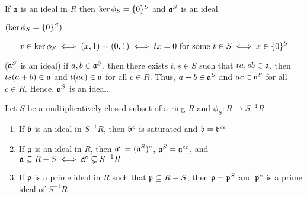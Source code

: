 \begin{proposition}
	If $\mathfrak{a}$ is an ideal in $R$ then $\ker \phi_S = \{0\}^S$ and $\mathfrak{a}^S$ is an ideal
\end{proposition}

\begin{longproof}
	$(\ker \phi_S = \{0\}^S)$

	$$
		x \in \ker \phi_S \iff (x, 1) \sim (0, 1) \iff tx = 0 \text{ for some } t \in S \iff x \in \{0\}^S
	$$
	
	($\mathfrak{a}^S$ is an ideal) if $a, b \in \mathfrak{a}^S$, then there exists $t, s \in S$ such that $ta, sb \in \mathfrak{a}$, then $ts(a + b) \in \mathfrak{a}$ and $t (ac) \in \mathfrak{a}$ for all $c \in R$. Thus, $a + b \in \mathfrak{a}^S$ and $ac \in \mathfrak{a}^S$ for all $c \in R$. Hence, $\mathfrak{a}^S$ is an ideal.
\end{longproof}


\begin{lemma}
	Let $S$ be a multiplicatively closed subset of a ring $R$ and $\phi_S: R \to S^{-1} R$
	\begin{enumerate}
		\item If $\mathfrak{b}$ is an ideal in $S^{-1} R$, then $\mathfrak{b}^c$ is saturated and $\mathfrak{b} = \mathfrak{b}^{ce}$
		
		\item If $\mathfrak{a}$ is an ideal in $R$, then $\mathfrak{a}^e = (\mathfrak{a}^S)^e$, $\mathfrak{a}^S = \mathfrak{a}^{ec}$, and $\mathfrak{a} \subseteq R - S \iff \mathfrak{a}^e \subsetneq S^{-1} R$
		
		\item If $\mathfrak{p}$ is a prime ideal in $R$ such that $\mathfrak{p} \subseteq R - S$, then $\mathfrak{p} = \mathfrak{p}^S$ and $\mathfrak{p}^e$ is a prime ideal of $S^{-1} R$
		\end{enumerate}
\end{lemma}

